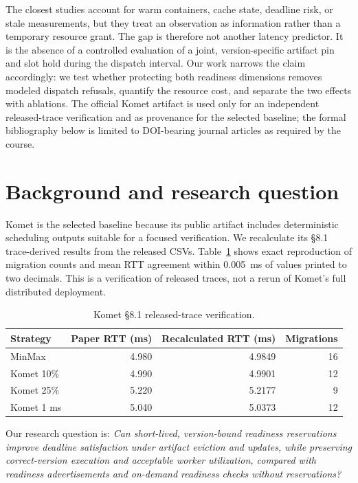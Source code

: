 \documentclass[conference]{IEEEtran}
\begin{document}
The closest studies account for warm containers, cache state, deadline risk, or stale measurements, but they treat an observation as information rather than a temporary resource grant. The gap is therefore not another latency predictor. It is the absence of a controlled evaluation of a joint, version-specific artifact pin and slot hold during the dispatch interval. Our work narrows the claim accordingly: we test whether protecting both readiness dimensions removes modeled dispatch refusals, quantify the resource cost, and separate the two effects with ablations. The official Komet artifact is used only for an independent released-trace verification and as provenance for the selected baseline; the formal bibliography below is limited to DOI-bearing journal articles as required by the course.

\section{Background and research question}

Komet is the selected baseline because its public artifact includes deterministic scheduling outputs suitable for a focused verification. We recalculate its \S8.1 trace-derived results from the released CSVs. Table~\ref{tab:komet} shows exact reproduction of migration counts and mean RTT agreement within 0.005~ms of values printed to two decimals. This is a verification of released traces, not a rerun of Komet's full distributed deployment.

\begin{table}[ht]
\centering
\caption{Komet \S8.1 released-trace verification.}
\label{tab:komet}
\small
\begin{tabular}{lrrr}
\toprule
Strategy & Paper RTT (ms) & Recalculated RTT (ms) & Migrations \\
\midrule
MinMax & 4.980 & 4.9849 & 16 \\
Komet 10\% & 4.990 & 4.9901 & 12 \\
Komet 25\% & 5.220 & 5.2177 & 9 \\
Komet 1 ms & 5.040 & 5.0373 & 12 \\
\bottomrule
\end{tabular}
\end{table}

Our research question is: \emph{Can short-lived, version-bound readiness reservations improve deadline satisfaction under artifact eviction and updates, while preserving correct-version execution and acceptable worker utilization, compared with readiness advertisements and on-demand readiness checks without reservations?}
\end{document}
